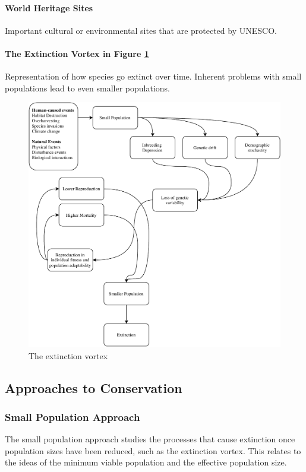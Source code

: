\documentclass[12pt]{article}
\begin{document}
\paragraph{World Heritage Sites}
Important cultural or environmental sites that are protected by UNESCO.

\paragraph{The Extinction Vortex in Figure \ref{vortex}}
Representation of how species go extinct over time. Inherent problems with small populations lead to even smaller populations. 

\begin{figure}[tph]
    \centering
    \includegraphics[width=5in]{vortex.pdf}
    \caption{The extinction vortex} \label{vortex}
\end{figure}

\subsection{Approaches to Conservation}

\subsubsection{Small Population Approach}

The small population approach studies the processes that cause extinction once population sizes have been reduced, such as the extinction vortex. This relates to the ideas of the minimum viable population and the effective population size.
\end{document}
